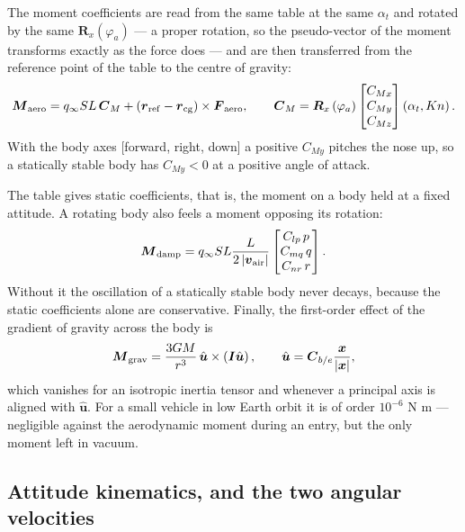 \documentclass[11pt,a4paper]{article}
\newcommand{\bx}{{\boldsymbol x}}
\newcommand{\bv}{{\boldsymbol v}}
\newcommand{\bF}{{\boldsymbol F}}
\newcommand{\bM}{{\boldsymbol M}}
\newcommand{\bI}{{\boldsymbol I}}
\newcommand{\bC}{{\boldsymbol C}}
\newcommand{\bR}{{\boldsymbol R}}
\begin{document}
The moment coefficients are read from the same table at the same $\alpha_t$ and rotated by
the same $\bR_x(\varphi_a)$ --- a proper rotation, so the pseudo-vector of the moment
transforms exactly as the force does --- and are then transferred from the reference point
of the table to the centre of gravity:
%
\begin{align}
	\bM_{\rm aero} = q_{\infty} S L \, \bC_{M}
	+ \left( {\boldsymbol r}_{\rm ref} - {\boldsymbol r}_{\rm cg} \right) \times \bF_{\rm aero} ,
	\qquad
	\bC_{M} = \bR_{x} \left( \varphi_a \right)
	\begin{bmatrix} C_{Mx} \\ C_{My} \\ C_{Mz} \end{bmatrix} \left( \alpha_t, Kn \right) .
	\label{moment_aero}
\end{align}
%
With the body axes [forward, right, down] a positive $C_{My}$ pitches the nose up, so a
statically stable body has $C_{My} < 0$ at a positive angle of attack.

The table gives static coefficients, that is, the moment on a body held at a fixed
attitude. A rotating body also feels a moment opposing its rotation:
%
\begin{align}
	\bM_{\rm damp} = q_{\infty} S L \frac{L}{2 \left| \bv_{\rm air} \right|}
	\begin{bmatrix} C_{lp} \, p \\ C_{mq} \, q \\ C_{nr} \, r \end{bmatrix} .
	\label{moment_damp}
\end{align}
%
Without it the oscillation of a statically stable body never decays, because the static
coefficients alone are conservative. Finally, the first-order effect of the gradient of
gravity across the body is
%
\begin{align}
	\bM_{\rm grav} = \frac{3 G M}{r^3} \, \hat{\boldsymbol u} \times \left( \bI \hat{\boldsymbol u} \right) ,
	\qquad
	\hat{\boldsymbol u} = \bC_{b/e} \frac{ \bx }{ \left| \bx \right| } ,
\end{align}
%
which vanishes for an isotropic inertia tensor and whenever a principal axis is aligned
with $\hat{\boldsymbol u}$. For a small vehicle in low Earth orbit it is of order
$10^{-6}$ N m --- negligible against the aerodynamic moment during an entry, but the only
moment left in vacuum.

\subsection{Attitude kinematics, and the two angular velocities}
\end{document}
